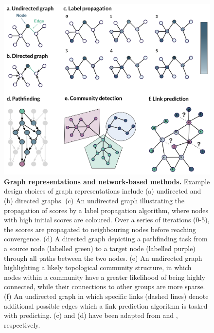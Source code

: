 \begin{figure}[H]
	\centering
		\includegraphics[width=\linewidth]{figures/network_algorithms.png}
	\caption{\footnotesize \textbf{Graph representations and network-based methods.} Example design choices of graph representations include (a) undirected and (b) directed graphs. (c) An undirected graph illustrating the propagation of scores by a label propagation algorithm, where nodes with high initial scores are coloured. Over a series of iterations (0-5), the scores are propagated to neighbouring nodes before reaching convergence. (d) A directed graph depicting a pathfinding task from a source node (labelled green) to a target node (labelled purple) through all paths between the two nodes. (e) An undirected graph highlighting a likely topological community structure, in which nodes within a community have a greater likelihood of being highly connected, while their connections to other groups are more sparse. (f) An undirected graph in which specific links (dashed lines) denote additional possible edges which a link prediction algorithm is tasked with predicting. (c) and (d) have been adapted from \parencite{cowen2017} and \parencite{domingo2022}, respectively.}
    \label{algorithms}
\end{figure}

